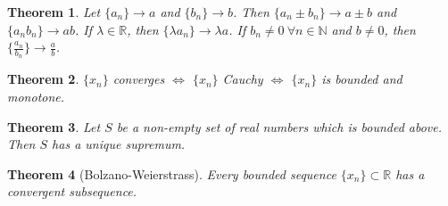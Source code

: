 \documentclass[11pt]{amsart}
\newtheorem{theorem}{Theorem}[section]
\theoremstyle{definition}
\newcommand{\reals}{\mathbb{R}}
\newcommand{\naturals}{\mathbb{N}}
\newcommand{\seq}{\{ x_n \}}
\begin{document}
\begin{theorem}
	Let $\{ a_n \} \to a$ and $\{ b_n \} \to b$. Then $\{ a_n  \pm b_n \} \to a \pm b$ and $\{ a_n b_n \} \to ab$. If $\lambda \in \reals$, then
	$\{ \lambda a_n \} \to \lambda a$. If $b_n \neq 0 \: \forall n \in \naturals$ and $b \neq 0$, then $\{ \frac{a_n}{b_n} \} \to \frac{a}{b}$.
\end{theorem}
\begin{theorem}
	$\seq$ converges $\iff$ $\seq$ Cauchy $\iff$ $\seq$ is bounded and monotone.
\end{theorem}
\begin{theorem}
	Let $S$ be a non-empty set of real numbers which is bounded above. Then $S$ has a unique supremum.
\end{theorem}
\begin{theorem}[Bolzano-Weierstrass]
	Every bounded sequence $\seq \subset \reals$ has a convergent subsequence.
\end{theorem}
\end{document}
